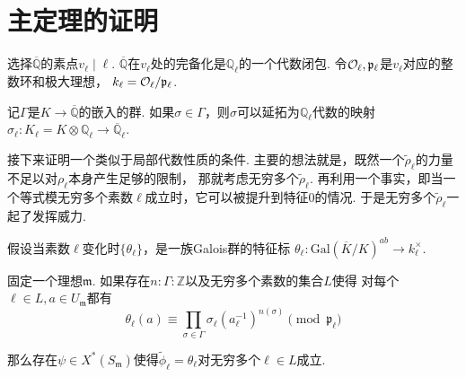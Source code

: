 \section{主定理的证明}

选择$\overline{\mathbb{Q}}$的素点$v_{\ell} \mid \ell$.
$\overline{\mathbb{Q}}$在$v_{\ell}$处的完备化是$\mathbb{Q}_{\ell}$的一个代数闭包.
令$\mathcal{O}_{\ell}, \mathfrak{p}_{\ell}$是$v_{\ell}$对应的整数环和极大理想，
$k_{\ell} = \mathcal{O}_{\ell} / \mathfrak{p}_{\ell}$.

记$\Gamma$是$K\to \overline{\mathbb{Q}}$的嵌入的群.
如果$\sigma\in \Gamma$，则$\sigma$可以延拓为$\mathbb{Q}_{\ell}$代数的映射
$\sigma_{\ell}: K_{\ell} = K\otimes \mathbb{Q}_{\ell}\to \overline{\mathbb{Q}}_{\ell}$.

接下来证明一个类似于局部代数性质的条件.
主要的想法就是，既然一个$\tilde{\rho}_{\ell}$的力量不足以对$\rho_{\ell}$本身产生足够的限制，
那就考虑无穷多个$\tilde{\rho}_{\ell}$.
再利用一个事实，即当一个等式模无穷多个素数$\ell$成立时，它可以被提升到特征$0$的情况.
于是无穷多个$\tilde{\rho}_{\ell}$一起了发挥威力.

假设当素数$\ell$变化时$\{\theta_{\ell}\}$，是一族Galois群的特征标
$\theta_{\ell}: \mathrm{Gal}(\overline{K}/K)^{ab}\to k_{\ell}^{\times}$.

\begin{cprop}
    固定一个理想$\mathfrak{m}$.
    如果存在$n:\Gamma: \mathbb{Z}$以及无穷多个素数的集合$L$使得
    对每个$\ell\in L, a\in U_{\mathfrak{m}}$都有
    \begin{equation}
        \theta_{\ell}(a) \equiv \prod_{\sigma\in \Gamma} \sigma_{\ell}(a_{\ell}^{-1})^{n(\sigma)} \pmod{\mathfrak{p}_{\ell}}
    \end{equation}

    那么存在$\psi\in X^{*}(S_{\mathfrak{m}})$使得$\tilde{\phi}_{\ell} = \theta_{\ell}$对无穷多个$\ell\in L$成立.
\end{cprop}

